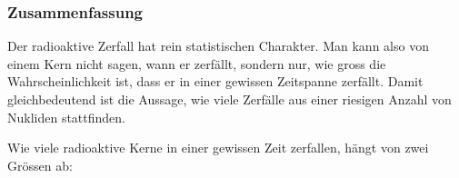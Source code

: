 \documentclass[12pt,a4paper,twoside]{article}
\begin{document}
%

%
%
%

\subsubsection*{Zusammenfassung}
Der radioaktive Zerfall hat rein statistischen Charakter. 
Man kann also von einem Kern nicht sagen, wann er zerfällt, sondern nur, wie gross die Wahrscheinlichkeit ist, 
dass er in einer gewissen Zeitspanne zerfällt. Damit gleichbedeutend ist die Aussage, 
wie viele Zerfälle aus einer riesigen Anzahl von Nukliden stattfinden.

Wie viele radioaktive Kerne in einer gewissen Zeit zerfallen, hängt von zwei Grössen ab:
\end{document}

